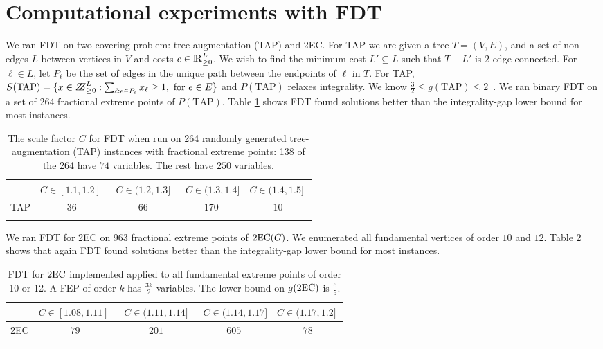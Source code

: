 \section{Computational experiments with FDT}\label{experiment}
We ran FDT on two covering problem: tree augmentation (TAP) and 2EC. For TAP we are given a tree $T=(V,E)$, and a set of non-edges $L$ between vertices in $V$ and costs $c\in {\rm I\!R}^{L}_{\geq 0}$. We wish to find the minimum-cost  $L'\subseteq L$ such that $T+L'$ is 2-edge-connected. For $\ell\in L$, let $P_\ell$ be the set of edges in the unique path between the endpoints of $\ell$ in $T$. For TAP, $S(\mbox{TAP})=\{x\in \bbbz^{L}_{\geq 0}: \sum_{\ell: e\in P_\ell}x_\ell \geq 1, \mbox{ for $e\in E$}\}$ and $P(\mbox{TAP})$ relaxes integrality. We know $\frac{3}{2}\leq g({\mbox{TAP}})\leq 2$~\cite{fj,32gap}. We ran binary FDT on a set of 264 fractional extreme points of $P(\mbox{TAP})$. Table \ref{tableTAP} shows FDT found solutions better than the integrality-gap lower bound for most instances.
\begin{table}[h]
	\centering
	  \begin{tabular}{c c c c c}
	  \toprule
	  	& $C\in [1.1,1.2]\;$ & $\;C\in (1.2,1.3]\;$ &
               $\;C\in (1.3,1.4]$ &\; $C\in (1.4,1.5]\;$ \\ \midrule
	  	TAP & $36$ & $66$ & $170$ & $10$\\  \bottomrule \\
	  \end{tabular}\caption{The scale factor $C$ for FDT when run on 264 randomly generated tree-augmentation (TAP) instances with fractional extreme points: 138 of the 264 have $74$ variables. The rest have $250$ variables.}
	  \label{tableTAP}
\end{table}
We ran FDT for 2EC on 963 fractional extreme points of $\operatorname{2EC}(G)$. We enumerated all fundamental vertices of order $10$ and $12$. Table \ref{table2EC} shows that again FDT found solutions better than the integrality-gap lower bound for most instances. 
\begin{table}[h!]
	\centering
	  \begin{tabular}{c c c c c}
	  	\toprule
	  	& $C\in [1.08,1.11]\;$ & $\;C\in (1.11,1.14]\;$ &
               $\;C\in (1.14,1.17]$ &\; $C\in (1.17,1.2]\;$ \\ \midrule
	  	2EC & $79$ & $201$ & $605$ & $78$ \\ \bottomrule\\
	  \end{tabular}	\caption{FDT for $\operatorname{2EC}$ implemented applied to all fundamental extreme points of order 10 or 12. A FEP of order $k$ has $\frac{3k}{2}$ variables. The lower bound on $g(\operatorname{2EC})$ is $\frac{6}{5}$.}
	  \label{table2EC}
\end{table}
